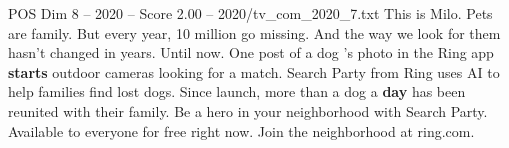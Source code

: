 \begin{textsample}{POS Dim 8 – 2020 – Score 2.00 – 2020/tv\_com\_2020\_7.txt}  \label{ex:f8_pos_023}
This is Milo.
Pets are family.
But every year, 10 million go missing.
And the way we look for them hasn't changed in years.
Until now.
One post of a dog 's photo in the Ring app \textbf{starts} outdoor cameras looking for a match.
Search Party from Ring uses AI to help families find lost dogs.
Since launch, more than a dog a \textbf{day} has been reunited with their family.
Be a hero in your neighborhood with Search Party.
Available to everyone for free right now.
Join the neighborhood at ring.com.

\end{textsample}
